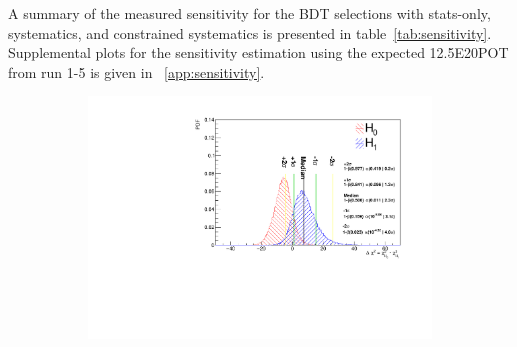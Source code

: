 A summary of the measured sensitivity for the BDT selections with stats-only, systematics, and constrained systematics is presented in table~\ref{tab:sensitivity}. Supplemental plots for the sensitivity estimation using the expected 12.5E20POT from run 1-5 is given in ~\cref{app:sensitivity}.



\begin{figure}[H]
    \begin{center}

    \begin{subfigure}{0.45\textwidth}
    \includegraphics[width=1.00\textwidth]{Sensitivity/sensitivity-run123/SBNfit_Cls_nue_1e0p_numu_reco_e_H1_mc_collab_syst_detsysCNP_Chi.pdf}

\end{subfigure}
\end{center}
\end{figure}

